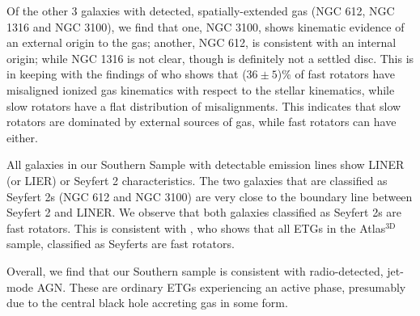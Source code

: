 	Of the other 3 galaxies with detected, spatially-extended gas (NGC 612, NGC 1316 and NGC 3100), we find that one, NGC 3100, shows kinematic evidence of an external origin to the gas; another, NGC 612, is consistent with an internal origin; while NGC 1316 is not clear, though is definitely not a settled disc. This is in keeping with the findings of \citet{Davis2011a} who shows that ($36\pm5$)\% of fast rotators have misaligned ionized gas kinematics with respect to the stellar kinematics, while slow rotators have a flat distribution of misalignments. This indicates that slow rotators are dominated by external sources of gas, while fast rotators can have either. 

	All galaxies in our Southern Sample with detectable emission lines show LINER (or LIER) or Seyfert 2 characteristics. The two galaxies that are classified as Seyfert 2s (NGC 612 and NGC 3100) are very close to the boundary line between Seyfert 2 and LINER. We observe that both galaxies classified as Seyfert 2s are fast rotators. This is consistent with \citet{Nyland2016}, who shows that all ETGs in the Atlas$^\text{3D}$ sample, classified as Seyferts are fast rotators. 

	Overall, we find that our Southern sample is consistent with radio-detected, jet-mode AGN. These are ordinary ETGs experiencing an active phase, presumably due to the central black hole accreting gas in some form. 
